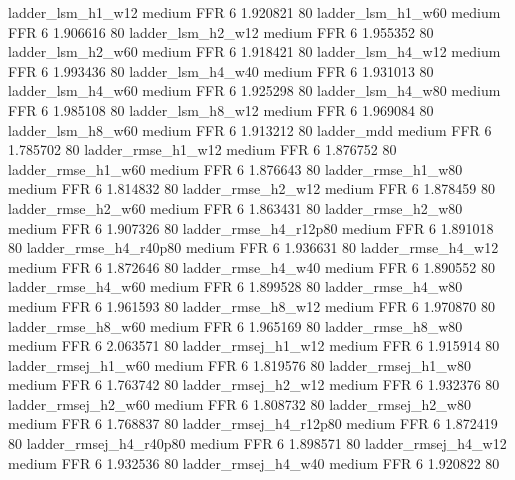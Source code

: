      ladder_lsm_h1_w12     medium      FFR                 6 1.920821 80
     ladder_lsm_h1_w60     medium      FFR                 6 1.906616 80
     ladder_lsm_h2_w12     medium      FFR                 6 1.955352 80
     ladder_lsm_h2_w60     medium      FFR                 6 1.918421 80
     ladder_lsm_h4_w12     medium      FFR                 6 1.993436 80
     ladder_lsm_h4_w40     medium      FFR                 6 1.931013 80
     ladder_lsm_h4_w60     medium      FFR                 6 1.925298 80
     ladder_lsm_h4_w80     medium      FFR                 6 1.985108 80
     ladder_lsm_h8_w12     medium      FFR                 6 1.969084 80
     ladder_lsm_h8_w60     medium      FFR                 6 1.913212 80
            ladder_mdd     medium      FFR                 6 1.785702 80
    ladder_rmse_h1_w12     medium      FFR                 6 1.876752 80
    ladder_rmse_h1_w60     medium      FFR                 6 1.876643 80
    ladder_rmse_h1_w80     medium      FFR                 6 1.814832 80
    ladder_rmse_h2_w12     medium      FFR                 6 1.878459 80
    ladder_rmse_h2_w60     medium      FFR                 6 1.863431 80
    ladder_rmse_h2_w80     medium      FFR                 6 1.907326 80
 ladder_rmse_h4_r12p80     medium      FFR                 6 1.891018 80
 ladder_rmse_h4_r40p80     medium      FFR                 6 1.936631 80
    ladder_rmse_h4_w12     medium      FFR                 6 1.872646 80
    ladder_rmse_h4_w40     medium      FFR                 6 1.890552 80
    ladder_rmse_h4_w60     medium      FFR                 6 1.899528 80
    ladder_rmse_h4_w80     medium      FFR                 6 1.961593 80
    ladder_rmse_h8_w12     medium      FFR                 6 1.970870 80
    ladder_rmse_h8_w60     medium      FFR                 6 1.965169 80
    ladder_rmse_h8_w80     medium      FFR                 6 2.063571 80
   ladder_rmsej_h1_w12     medium      FFR                 6 1.915914 80
   ladder_rmsej_h1_w60     medium      FFR                 6 1.819576 80
   ladder_rmsej_h1_w80     medium      FFR                 6 1.763742 80
   ladder_rmsej_h2_w12     medium      FFR                 6 1.932376 80
   ladder_rmsej_h2_w60     medium      FFR                 6 1.808732 80
   ladder_rmsej_h2_w80     medium      FFR                 6 1.768837 80
ladder_rmsej_h4_r12p80     medium      FFR                 6 1.872419 80
ladder_rmsej_h4_r40p80     medium      FFR                 6 1.898571 80
   ladder_rmsej_h4_w12     medium      FFR                 6 1.932536 80
   ladder_rmsej_h4_w40     medium      FFR                 6 1.920822 80
